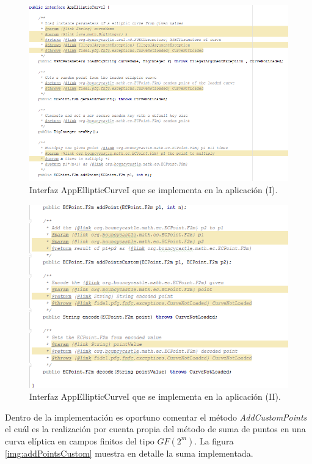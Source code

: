 \documentclass[../PFC.tex]{subfiles}
\begin{document}
\begin{figure}[H]
  \centering
  \includegraphics[width=1\textwidth]{./img/eci1}
  \caption{Interfaz AppEllipticCurveI que se implementa en la aplicación (I).}
  \label{img:eci1}
\end{figure}
 
\begin{figure}[H]
  \centering
  \includegraphics[width=1\textwidth]{./img/eci2}
  \caption{Interfaz AppEllipticCurveI que se implementa en la aplicación (II).}
  \label{img:eci2}
\end{figure}

Dentro de la implementación es oportuno comentar el método \textit{AddCustomPoints} el cuál es la realización por cuenta propia del método de suma de puntos en una curva elíptica en campos finitos del tipo \(GF(2^m)\). La figura \ref{img:addPointsCustom} muestra en detalle la suma implementada.
\end{document}
